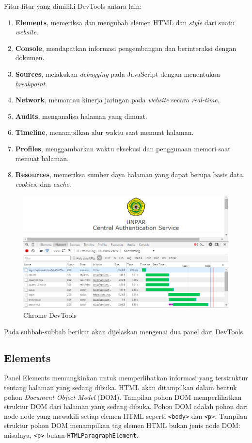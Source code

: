 Fitur-fitur yang dimiliki DevTools antara lain:
\begin{enumerate}
	\item \textbf{Elements}, memeriksa dan mengubah elemen HTML dan \textit{style} dari suatu \textit{website}.
	\item \textbf{Console}, mendapatkan informasi pengembangan dan berinteraksi dengan dokumen.
	\item \textbf{Sources}, melakukan \textit{debugging} pada JavaScript dengan menentukan \textit{breakpoint}.
	\item \textbf{Network}, memantau kinerja jaringan pada \textit{website} secara \textit{real-time}.
	\item \textbf{Audits}, menganalisa halaman yang dimuat.
	\item \textbf{Timeline}, menampilkan alur waktu saat memuat halaman.
	\item \textbf{Profiles}, menggambarkan waktu eksekusi dan penggunaan memori saat memuat halaman.
	\item \textbf{Resources}, memeriksa sumber daya halaman yang dapat berupa basis data, \textit{cookies}, dan \textit{cache}.
\end{enumerate}

\begin{figure}[H]
	\centering
	\includegraphics[scale=0.5]{Gambar/chrome-devtools}
	\caption{Chrome DevTools} 
	\label{fig:chrome_devtools}
\end{figure}

Pada subbab-subbab berikut akan dijelaskan mengenai dua panel dari DevTools.
\subsection{Elements}
Panel Elements memungkinkan untuk memperlihatkan informasi yang terstruktur tentang halaman yang sedang dibuka. HTML akan ditampilkan dalam bentuk pohon \textit{Document Object Model} (DOM). Tampilan pohon DOM memperlihatkan struktur DOM dari halaman yang sedang dibuka. Pohon DOM adalah pohon dari node-node yang mewakili setiap elemen HTML seperti \texttt{<body>} dan \texttt{<p>}. Tampilan struktur pohon DOM menampilkan tag elemen HTML bukan jenis node DOM: misalnya, \texttt{<p>} bukan \texttt{HTMLParagraphElement}.

